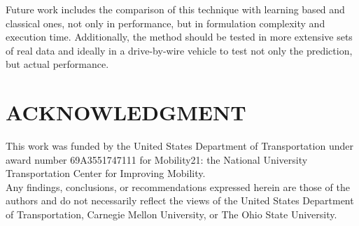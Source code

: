 \documentclass[letterpaper, 10 pt, conference]{ieeeconf}  %
\begin{document}
Future work includes the comparison of this technique with learning based and classical ones, not only in performance, but in formulation complexity and execution time. Additionally, the method should be tested in more extensive sets of real data and ideally in a drive-by-wire vehicle to test not only the prediction, but actual performance. 






\section*{ACKNOWLEDGMENT}

This work was funded by the United States Department of Transportation
under award number 69A3551747111 for Mobility21: the National University
Transportation Center for Improving Mobility.\\
Any findings, conclusions, or recommendations expressed herein are those
of the authors and do not necessarily reflect the views of the United
States Department of Transportation, Carnegie Mellon University, or
The Ohio State University.



\end{document}
